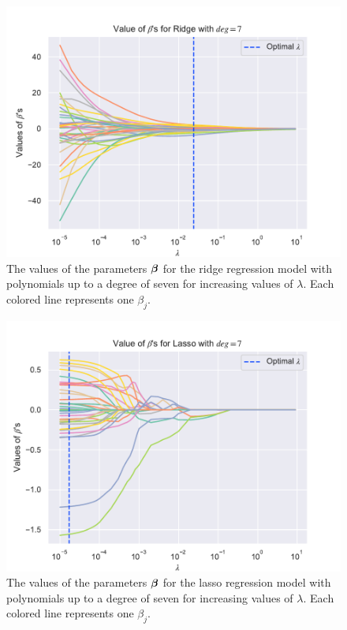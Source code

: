 \begin{figure}[h!]
    \centering
    \includegraphics[width=1\linewidth]{project_1_alt/figures/figures_in_report/Ridge_Betas_lambda_Franke_Noise_const_deg.pdf}
    \caption{The values of the parameters $\boldsymbol{\beta}$ for the ridge regression model with polynomials up to a degree of seven for increasing values of $\lambda$. Each colored line represents one $\beta_j$.}
    \label{fig:ridge_betas}
\end{figure}

\begin{figure}[h!]
    \centering
    \includegraphics[width=1\linewidth]{project_1_alt/figures/figures_in_report/lasso_Betas_lambda_Franke_Noise_const_deg.pdf}
    \caption{The values of the parameters $\boldsymbol{\beta}$ for the lasso regression model with polynomials up to a degree of seven for increasing values of $\lambda$. Each colored line represents one $\beta_j$.}
    \label{fig:lasso_betas}
\end{figure}

